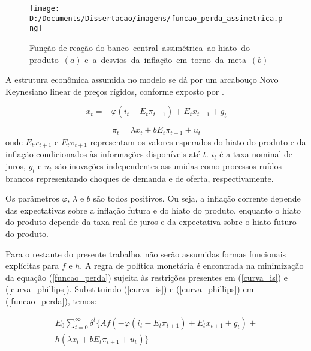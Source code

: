 \documentclass[
	article,			%
	11pt,				%
	oneside,			%
	a4paper,			%
	english,			%
	brazil,				%
	]{abntex2}
\begin{document}
	\begin{figure}[!h]
	\texttt{[image: D:/Documents/Dissertacao/imagens/funcao\_perda\_assimetrica.png]}
	\caption{Função de reação do banco~central~assimétrica~ao hiato~do produto~$(a)$ e~a~desvios~da~inflação~em~torno~da~meta~$(b)$}
	\label{fig:funcao_reacao_assimetrica}
	\end{figure}
	
	A estrutura econômica assumida no modelo se dá por um arcabouço Novo Keynesiano linear de preços rígidos, conforme exposto por .
		
	\begin{equation}  \label{curva_is}
		x_t=-\varphi(i_t-E_t\pi_{t+1}) + E_tx_{t+1} + g_t
	\end{equation}
	
	\begin{equation} \label{curva_phillips}
		\pi_t = \lambda x_t + bE_t\pi_{t+1} + u_t
	\end{equation}
%
	onde $E_tx_{t+1}$ e $E_t\pi_{t+1}$ representam os valores esperados do hiato do produto e da inflação condicionados às informações disponíveis até $t$. $i_t$ é a taxa nominal de juros, $g_t$ e $u_t$ são inovações independentes assumidas como processos ruídos brancos representando choques de demanda e de oferta, respectivamente. 
	
	Os parâmetros $\varphi$, $\lambda$ e $b$ são todos positivos. Ou seja, a inflação corrente depende das expectativas sobre a inflação futura e do hiato do produto, enquanto o hiato do produto depende da taxa real de juros e da expectativa sobre o hiato futuro do produto.
	
	Para o restante do presente trabalho, não serão assumidas formas funcionais explícitas para $f$ e $h$. A regra de política monetária é encontrada na minimização da equação (\ref{funcao_perda}) sujeita às restrições presentes em (\ref{curva_is}) e (\ref{curva_phillips}). Substituindo (\ref{curva_is}) e (\ref{curva_phillips}) em (\ref{funcao_perda}), temos:
	
	\begin{eqnarray} \label{problem_min}
		E_0\sum_{t=0}^{\infty}\delta^t \{ Af(-\varphi(i_t-E_t\pi_{t+1}) + E_tx_{t+1} + g_t) +\nonumber \\ h(\lambda x_t + bE_t\pi_{t+1} + u_t) \}
	\end{eqnarray}
	
\end{document}
